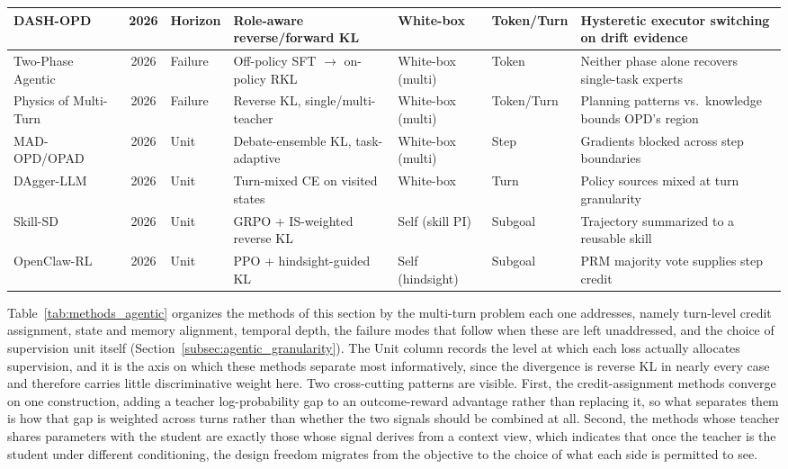 \documentclass{article} %
\begin{document}
\begin{table}[t]
{\begin{tabular}{@{}lclllll@{}}
        DASH-OPD~\citep{2607.29078} & 2026 & Horizon & Role-aware reverse/forward KL & White-box & Token/Turn & Hysteretic executor switching on drift evidence \\
        \midrule
        Two-Phase Agentic~\citep{2606.30044} & 2026 & Failure & Off-policy SFT $\to$ on-policy RKL & White-box (multi) & Token & Neither phase alone recovers single-task experts \\
        Physics of Multi-Turn~\citep{2607.24720} & 2026 & Failure & Reverse KL, single/multi-teacher & White-box (multi) & Token/Turn & Planning patterns vs.\ knowledge bounds OPD's region \\
        \midrule
        MAD-OPD/OPAD~\citep{2605.01347} & 2026 & Unit & Debate-ensemble KL, task-adaptive & White-box (multi) & Step & Gradients blocked across step boundaries \\
        DAgger-LLM~\citep{2605.12913} & 2026 & Unit & Turn-mixed CE on visited states & White-box & Turn & Policy sources mixed at turn granularity \\
        Skill-SD~\citep{2604.10674} & 2026 & Unit & GRPO + IS-weighted reverse KL & Self (skill PI) & Subgoal & Trajectory summarized to a reusable skill \\
        OpenClaw-RL~\citep{2603.10165} & 2026 & Unit & PPO + hindsight-guided KL & Self (hindsight) & Subgoal & PRM majority vote supplies step credit \\
        \bottomrule
    \end{tabular}
    }
\end{table}

Table~\ref{tab:methods_agentic} organizes the methods of this section by the multi-turn problem each one addresses, namely turn-level credit assignment, state and memory alignment, temporal depth, the failure modes that follow when these are left unaddressed, and the choice of supervision unit itself (Section~\ref{subsec:agentic_granularity}). The Unit column records the level at which each loss actually allocates supervision, and it is the axis on which these methods separate most informatively, since the divergence is reverse KL in nearly every case and therefore carries little discriminative weight here. Two cross-cutting patterns are visible. First, the credit-assignment methods converge on one construction, adding a teacher log-probability gap to an outcome-reward advantage rather than replacing it, so what separates them is how that gap is weighted across turns rather than whether the two signals should be combined at all. Second, the methods whose teacher shares parameters with the student are exactly those whose signal derives from a context view, which indicates that once the teacher is the student under different conditioning, the design freedom migrates from the objective to the choice of what each side is permitted to see.
\end{document}
